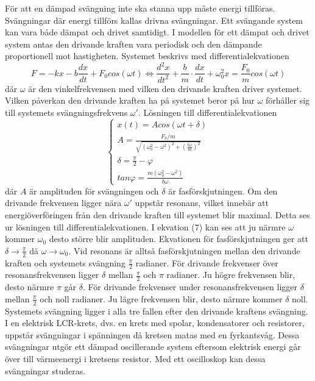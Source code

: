 \documentclass[a4paper,10pt]{article}
\begin{document}
För att en dämpad svängning inte ska stanna upp måste energi tillföras. Svängningar där energi tillförs kallas drivna svängningar. Ett svängande system kan vara både dämpat och drivet samtidigt. I modellen för ett dämpat och drivet system antas den drivande kraften vara periodisk och den dämpande proportionell mot hastigheten. Systemet beskrivs med differentialekvationen
\begin{equation}
F = -kx - b\frac{dx}{dt} + F_0cos(\omega t) \Longleftrightarrow\frac{d^2x}{dt^2} + \frac{b}{m}\cdot\frac{dx}{dt} + \omega_0^2x = \frac{F_0}{m} cos(\omega t)
\end{equation}
där $\omega$ är den vinkelfrekvensen med vilken den drivande kraften driver systemet.
Vilken påverkan den drivande kraften ha på systemet beror på hur $\omega$ förhåller sig  till systemets svängningsfrekvens $\omega'$. Lösningen till differentialekvationen 
\begin{equation}
\begin{cases}
	x(t) = Acos(\omega t + \delta) \\
	A = \frac{F_0/m}{\sqrt{(\omega_0^2 - \omega^2)^2 + (\frac{b\omega}{m})^2}} \\
	\delta = \frac{\pi}{2} - \varphi \\
	tan\varphi = \frac{m(\omega_0^2 - \omega^2)}{b\omega}
\end{cases}
\end{equation}
där $A$ är amplituden för svängningen och $\delta$ är fasförskjutningen. Om den drivande frekvensen ligger nära $\omega'$ uppstår resonans, vilket innebär att energiöverföringen från den drivande kraften till systemet blir maximal. Detta ses ur lösningen till differentialekvationen. I ekvation (7) kan ses att ju närmre $\omega$ kommer $\omega_0$ desto större blir amplituden. Ekvationen för fasförskjutningen ger att $\delta \rightarrow \frac{\pi}{2}$ då $\omega \rightarrow \omega_0$. Vid resonans är alltså fasförskjutningen mellan den drivande kraften och systemets svängning $\frac{\pi}{2}$ radianer. För drivande frekvenser över resonansfrekvensen ligger $\delta$ mellan $\frac{\pi}{2}$ och $\pi$ radianer. Ju högre frekvensen blir, desto närmre $\pi$ går $\delta$. För drivande frekvenser under resonansfrekvensen ligger $\delta$ mellan $\frac{\pi}{2}$ och noll radianer. Ju lägre frekvensen blir, desto närmre kommer $\delta$ noll. Systemets svängning ligger i alla tre fallen efter den drivande kraftens svängning.\\

I en elektrisk LCR-krets, dvs. en krets med spolar, kondensatorer och resistorer, uppstår svängningar i spänningen då kretsen matas med en fyrkantsvåg. Dessa svängningar utgör ett dämpad oscillerande system eftersom elektrisk energi går över till värmeenergi i kretsens resistor. Med ett oscilloskop kan dessa svängningar studeras.
\end{document}
